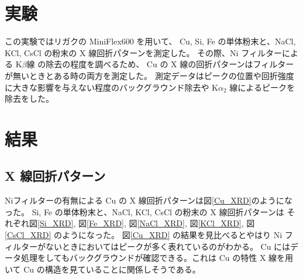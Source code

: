\documentclass[11pt,dvipdfmx,a4paper]{jsarticle}
\begin{document}
\section{実験}
この実験ではリガクの MiniFlex600 を用いて、
Cu, Si, Fe の単体粉末と、NaCl, KCl, CsCl の粉末の X 線回折パターンを測定した。
その際、Ni フィルターによる K\(\beta\)線 の除去の程度を調べるため、
Cu の X 線の回折パターンはフィルターが無いときとある時の両方を測定した。
測定データはピークの位置や回折強度に大きな影響を与えない程度のバックグラウンド除去や
K\(\alpha_2\) 線によるピークを除去をした。

\section{結果}
\subsection{X 線回折パターン}
Niフィルターの有無による Cu の X 線回折パターンは図\ref{Cu_XRD}のようになった。
Si, Fe の単体粉末と、NaCl, KCl, CsCl の粉末の X 線回折パターンは
それぞれ図\ref{Si_XRD}, 図\ref{Fe_XRD}, 図\ref{NaCl_XRD}, 図\ref{KCl_XRD}, 図\ref{CsCl_XRD} のようになった。
図\ref{Cu_XRD} の結果を見比べるとやはり Ni フィルターがないときにおいてはピークが多く表れているのがわかる。
Cu にはデータ処理をしてもバックグラウンドが確認できる。これは Cu の特性 X 線を用いて Cu の構造を見ていることに関係しそうである。
\end{document}
